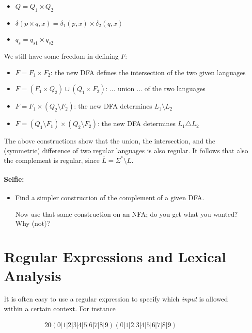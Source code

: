 \begin{itemize}
\item $Q = Q_1 \times Q_2$
\item $\delta(p \times q,x) = \delta_1(p,x) \times \delta_2(q,x)$
\item $q_s = q_{s1} \times q_{s2}$
\end{itemize}

We still have some freedom in defining $F$:

\begin{itemize}
\item $F = F_1 \times F_2$: the new DFA defines the intersection of
  the two given languages
\item $F = (F_1 \times Q_2) \cup (Q_1 \times F_2)$: ... union ...
of the two languages
\item $F = F_1 \times (Q_2 \setminus F_2)$: the new DFA determines
 $L_1 \setminus L_2$
\item $F = (Q_1 \setminus F_1) \times (Q_2 \setminus F_2)$: the new
  DFA determines $L_1 \triangle L_2$
\end{itemize}

The above constructions show that the union, the intersection, and the
(symmetric) difference of two regular languages is also regular. It
follows that also the complement is regular, since
%
$\overline{L} = \Sigma^* \setminus L$.

\paragraph{Selfie:}
\begin{itemize}
\item[]
Find a simpler construction of the complement of a given DFA.

Now use that same construction on an NFA; do you get what you wanted?
Why (not)?
\end{itemize}







\section{Regular Expressions and Lexical Analysis}

It is often easy to use a regular expression to specify which {\em
  input} is allowed within a certain context. For instance


~~~~~~~~~~~~$20(0|1|2|3|4|5|6|7|8|9)(0|1|2|3|4|5|6|7|8|9)$

